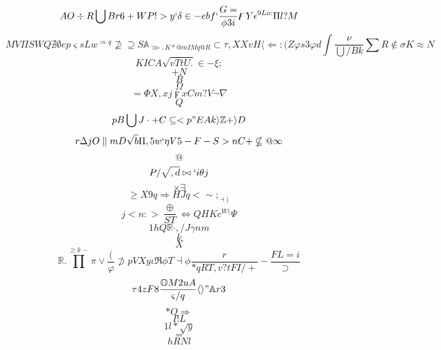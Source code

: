 \documentclass[12pt]{article}
\begin{document}
        \begin{minipage}[t][0pt]{\linewidth}

        \[AO\div R\bigcup B r 6 + W P ! > y `\delta\in - e b f `\frac{G=}{\phi 3 i}\digamma Y\epsilon^{9Lo:}\Pi l ? {M}\]
\[MV\Pi S W Q\nexists\emptyset e p\varsigma s L w^{\Longrightarrow q}\nsupseteq\supseteq S\mathbb{A}_{\ggg , K * @ m I M q @ R}\subset\tau , X X v H\langle\Longleftarrow : {(Z}\varphi s 3\varphi d\int\frac{\nu}{\bigcup / B k}\sum R\notin\sigma K\approx N\]
\[KICA\sqrt{vTtU.}\in -\xi ;\]
\[+N\]
\[B\]
\[\Omega\]
\[=\Phi X , x j\digamma x C m ? V\neg\nabla\]
\[Q\]
\[pB\bigcup J\cdot + C\subseteq < p " E A k\rangle\mathbb{Z} +\rangle D\]
\[r\Delta j O\parallel m D\sqrt{b}\Pi , 5 w `\eta V 5 - F - S > n C +\nsubseteq @\infty\]
\[@\]
\[P/\sqrt{,d}\bowtie ` i\theta j\]
\[\times\exists\]
\[\geq X 9 q\Rightarrow H J q <\sim ;_{\dashv )}\]
\[j<n:>\frac{\oplus}{ S T}\Leftrightarrow Q H K c^{W(}\Psi\]
\[1hQ\mathbb{R}\cdot , / J\gamma n m\]
\[k\]
\[X\]
\[\mathbb{R} .\prod^{\geq k -}\pi\lor\frac{(}{\varphi}\not\supset p V X y\iota\Re\phi T {\dashv}\phi\frac{r}{*qRT,v?tFI/+}-\frac{FL=i}{\supset}\]
\[\tau 4 z F 8\frac{\mathbb{O} M 2 u A}{\varsigma / q}\langle\rangle "\mathbb{A} r 3\]
\[*O\Rightarrow\]
\[I!L\]
\[1l*\sqrt{y}\]
\[=\]
\[hRNl
        \]
\end{minipage}
\end{document}
